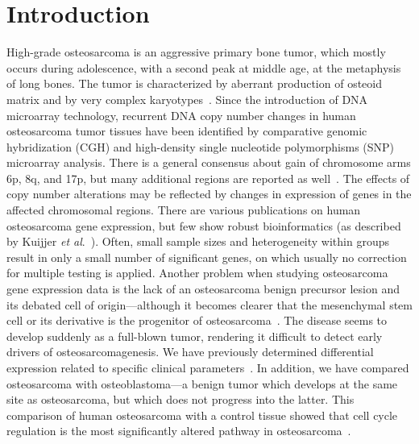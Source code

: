 \section{Introduction}\label{introduction7}
High-grade osteosarcoma is an aggressive primary
bone tumor, which mostly occurs during
adolescence, with a second peak at middle age,
at the metaphysis of long bones. The tumor is
characterized by aberrant production of osteoid
matrix and by very complex karyotypes~\cite{raymond2002conventional,cleton2005central}.
Since the introduction of DNA microarray technology,
recurrent DNA copy number changes in
human osteosarcoma tumor tissues have been
identified by comparative genomic hybridization
(CGH) and high\hyp{}density single nucleotide polymorphisms
(SNP) microarray analysis. There is a
general consensus about gain of chromosome
arms 6p, 8q, and 17p, but many additional regions
are reported as well~\cite{squire2003high,man2004genome,
atiye2005gene,yen2009identification,kresse2010evaluation}. The effects of copy number
alterations may be reflected by changes in expression
of genes in the affected chromosomal
regions. There are various publications on human
osteosarcoma gene expression, but few show robust
bioinformatics (as described by Kuijjer {\it et al}.~\cite{kuijjer2011mrna}). Often, small sample sizes and heterogeneity
within groups result in only a small number of
significant genes, on which usually no correction
for multiple testing is applied. Another problem
when studying osteosarcoma gene expression data
is the lack of an osteosarcoma benign precursor
lesion and its debated cell of origin---although it
becomes clearer that the mesenchymal stem cell
or its derivative is the progenitor of osteosarcoma~\cite{mohseny2009osteosarcoma,mohseny2011concise}. The disease seems to develop suddenly as
a full\hyp{}blown tumor, rendering it difficult to detect
early drivers of osteosarcomagenesis. We have
previously determined differential expression
related to specific clinical parameters~\cite{buddingh2011tumor,kuijjer2011mrna}. In addition, we
have compared osteosarcoma with osteoblastoma---a
benign tumor which develops at the
same site as osteosarcoma, but which does not
progress into the latter. This comparison of
human osteosarcoma with a control tissue showed
that cell cycle regulation is the most significantly
altered pathway in osteosarcoma~\cite{cleton2009profiling}.

